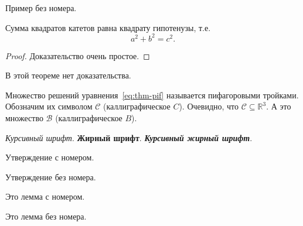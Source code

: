 \documentclass[colorthm, bib]{../civarticle}
\begin{document}
\blinditemize%

\blindenumerate%

\blinddescription%

\begin{example*}
  Пример без номера.
  \Blindtext[2]
\end{example*}

\Blindtext[2]

\begin{theorem}
  Сумма квадратов катетов равна квадрату гипотенузы, т.е.
  \begin{equation}
    \label{eq:thm-pif}
    a^2+b^2=c^2.
  \end{equation}
\end{theorem}
\begin{proof}
  Доказательство очень простое.
\end{proof}

\begin{theorem}\label{thm:example:noproof}
  В этой теореме нет доказательства.
  \Blindtext[2]
\end{theorem}

\Blindtext[2]

Множество решений уравнения~\eqref{eq:thm-pif} называется пифагоровыми
тройками.  Обозначим их символом $\mathcal{C}$ (каллиграфическое $C$).
Очевидно, что $\mathcal{C}\subseteq \mathbb{R}^{3}$.  А это множество
$\mathcal{B}$ (каллиграфическое $B$).

\textit{Курсивный шрифт}.  \textbf{Жирный шрифт}.
\textit{\textbf{Курсивный жирный шрифт}}.


\begin{proposition}\label{prop:example:numbered}
  Утверждение с номером.
  \Blindtext[2]
\end{proposition}

\begin{proposition*}
  Утверждение без номера.
  \Blindtext[2]
\end{proposition*}

\Blindtext[2]

\begin{lemma}\label{lem:example:numbered}
  Это лемма с номером.
  \Blindtext[2]
\end{lemma}

\begin{lemma*}
  Это лемма без номера.
  \Blindtext[2]
\end{lemma*}
\end{document}
